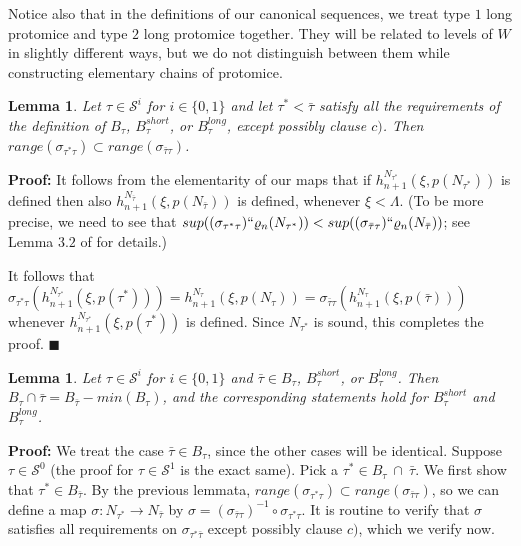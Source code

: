 \documentclass[12pt]{article}
\newtheorem{lem}[thm]{Lemma}
\begin{document}
Notice also that in the definitions of our canonical sequences, we treat type $1$ long protomice and type $2$ long protomice together.  They will be related to levels of $W$ in slightly different ways, but we do not distinguish between them while constructing elementary chains of protomice.\\







\begin{lem} \label{range inclusion}
Let $\tau \in \mathcal{S}^i$ for $i \in \{ 0 , 1 \}$ and let $\tau^* < \bar{\tau}$ satisfy all the requirements of the definition of $B_\tau$, $B_\tau^{short}$, or $B_\tau^{long}$, except possibly clause $c)$.  Then $range (\sigma_{\tau^* \tau} ) \subset range ( \sigma_{\bar{\tau} \tau } )$.
\end{lem}

\textbf{Proof:} It follows from the elementarity of our maps that if $h_{n+1}^{N_{\tau^*}} ( \xi , p ( N_{\tau^*} ))$ is defined then also  $h_{n+1}^{N_{\bar{\tau}}} ( \xi , p ( N_{\bar{\tau}} ))$ is defined, whenever $\xi < \Lambda$.  (To be more precise, we need to see that $sup ( ( \sigma_{\tau^* \tau }) `` \varrho_n (N_{\tau^*}) ) < sup ( ( \sigma_{\bar{\tau} \tau }) `` \varrho_n (N_{\bar{\tau}}) )$; see Lemma $3.2$ of \cite{zeman square proof} for details.)  

It follows that $\sigma_{\tau^* \tau } (h_{n+1}^{N_{\tau^*}} ( \xi , p ( \tau^*))) = h_{n+1}^{N_\tau} ( \xi , p ( N_\tau )) = \sigma_{\bar{\tau} \tau } (h_{n+1}^{N_{\tau}} ( \xi , p ( \bar{\tau})))$ whenever $h_{n+1}^{N_{\tau^*}} ( \xi , p ( \tau^*))$ is defined.  Since $N_{\tau^*}$ is sound, this completes the proof. $\blacksquare$\\

\begin{lem} \label{almost coherency of B}
Let $\tau \in \mathcal{S}^i$ for $i \in \{ 0 , 1 \}$ and $\bar{\tau} \in B_\tau$, $B_\tau^{short}$, or $B_\tau^{long}$.  Then $B_\tau \cap \bar{\tau} = B_{\bar{\tau}} - min (B_\tau)$, and the corresponding statements hold for $B_\tau^{short}$ and $B_\tau^{long}$.
\end{lem}

\textbf{Proof:}  We treat the case $\bar{\tau} \in B_\tau$, since the other cases will be identical.  Suppose $\tau \in \mathcal{S}^0$ (the proof for $\tau \in \mathcal{S}^1$ is the exact same).  Pick a $\tau^* \in B_\tau \ \cap \ \bar{\tau}$.  We first show that $\tau^* \in B_{\bar{\tau}}$.  By the previous lemmata, $range ( \sigma_{\tau^* \tau} ) \subset  range ( \sigma_{\bar{\tau} \tau} )$, so we can define a map $\sigma: N_{\tau^*} \longrightarrow N_{\bar{\tau}}$ by $\sigma = ( \sigma_{\bar{\tau} \tau})^{-1} \circ \sigma_{\tau^* \tau} $.  It is routine to verify that $\sigma$ satisfies all requirements on $\sigma_{\tau^* \bar{\tau}}$ except possibly clause $c)$, which we verify now.\\
\end{document}
